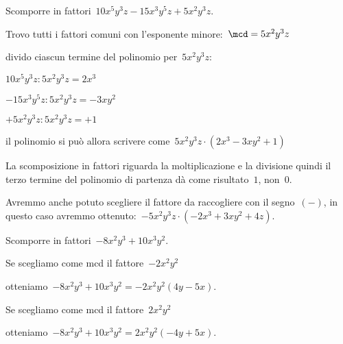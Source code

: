  \begin{esempio}
Scomporre in fattori~\(10x^{5}y^{3}z-15x^{3}y^{5}z+5x^{2}y^{3}z\).
 \begin{enumeratea}
 \item Trovo tutti i fattori comuni con l'esponente minore:~\(\mcd=5x^{2}y^{3}z\)
 \item divido ciascun termine del polinomio per~\(5x^{2}y^{3}z\):
   \begin{itemize*}
   \item \(10x^{5}y^{3}z:5x^{2}y^{3}z=2x^{3}\)
   \item \(-15x^{3}y^{5}z:5x^{2}y^{3}z=-3xy^{2}\)
   \item \(+5x^{2}y^{3}z:5x^{2}y^{3}z=+1\)
   \end{itemize*}
 \item il polinomio si può allora scrivere 
  come~\(5x^{2}y^{3}z\cdot (2x^{3}-3xy^{2}+1)\)
 \end{enumeratea}
 \end{esempio}

\osservazione La scomposizione in fattori riguarda la moltiplicazione e la 
 divisione quindi il terzo termine del polinomio di partenza dà come 
 risultato~\(1\), non~\(0\).
 
\osservazione Avremmo anche potuto scegliere il fattore da raccogliere 
 con il segno~\((-)\), in questo caso avremmo 
 ottenuto:~\(-5x^{2}y^{3}z\cdot (-2x^{3}+3xy^{2}+4z)\).
 
 \begin{esempio}
Scomporre in fattori~\(-8x^{2}y^{3}+10x^{3}y^{2}\).
 \begin{enumerate*}
 \item \begin{enumeratea}
  \item Se scegliamo come mcd il fattore~\(-2x^{2}y^{2}\)
  \item otteniamo~\(-8x^{2}y^{3}+10x^{3}y^{2}=-2x^{2}y^{2}(4y-5x)\).
 \end{enumeratea}
 \item \begin{enumeratea}
  \item Se scegliamo come mcd il fattore~\(2x^{2}y^{2}\)
  \item otteniamo~\(-8x^{2}y^{3}+10x^{3}y^{2}=2x^{2}y^{2}(-4y+5x)\).
 \end{enumeratea}
 \end{enumerate*}
 \end{esempio}



